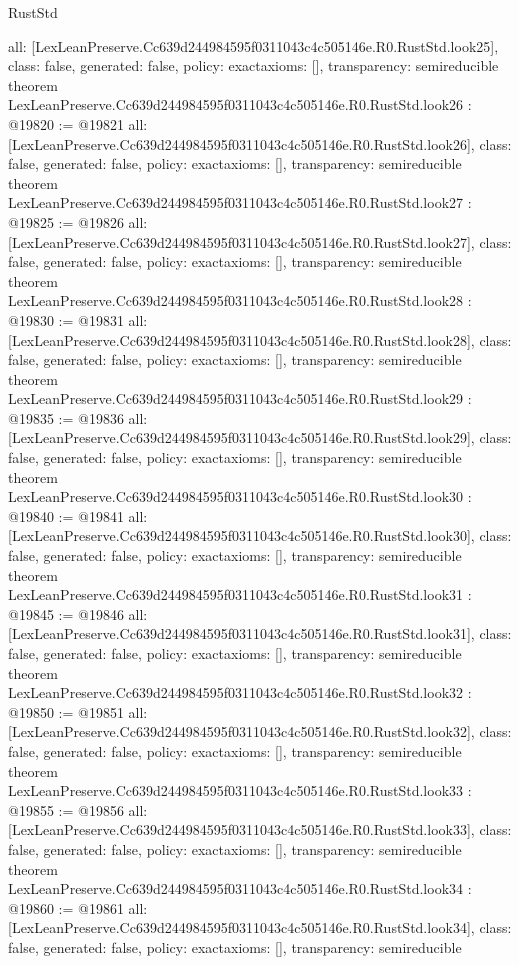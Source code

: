 \begin{lexlean}{RustStd}
\begin{coremodule}
{  all: [LexLeanPreserve.Cc639d244984595f0311043c4c505146e.R0.RustStd.look25],
  class: false,
  generated: false,
  policy: exact{axioms: []},
  transparency: semireducible
}
theorem LexLeanPreserve.Cc639d244984595f0311043c4c505146e.R0.RustStd.look26 : @19820 := @19821 {
  all: [LexLeanPreserve.Cc639d244984595f0311043c4c505146e.R0.RustStd.look26],
  class: false,
  generated: false,
  policy: exact{axioms: []},
  transparency: semireducible
}
theorem LexLeanPreserve.Cc639d244984595f0311043c4c505146e.R0.RustStd.look27 : @19825 := @19826 {
  all: [LexLeanPreserve.Cc639d244984595f0311043c4c505146e.R0.RustStd.look27],
  class: false,
  generated: false,
  policy: exact{axioms: []},
  transparency: semireducible
}
theorem LexLeanPreserve.Cc639d244984595f0311043c4c505146e.R0.RustStd.look28 : @19830 := @19831 {
  all: [LexLeanPreserve.Cc639d244984595f0311043c4c505146e.R0.RustStd.look28],
  class: false,
  generated: false,
  policy: exact{axioms: []},
  transparency: semireducible
}
theorem LexLeanPreserve.Cc639d244984595f0311043c4c505146e.R0.RustStd.look29 : @19835 := @19836 {
  all: [LexLeanPreserve.Cc639d244984595f0311043c4c505146e.R0.RustStd.look29],
  class: false,
  generated: false,
  policy: exact{axioms: []},
  transparency: semireducible
}
theorem LexLeanPreserve.Cc639d244984595f0311043c4c505146e.R0.RustStd.look30 : @19840 := @19841 {
  all: [LexLeanPreserve.Cc639d244984595f0311043c4c505146e.R0.RustStd.look30],
  class: false,
  generated: false,
  policy: exact{axioms: []},
  transparency: semireducible
}
theorem LexLeanPreserve.Cc639d244984595f0311043c4c505146e.R0.RustStd.look31 : @19845 := @19846 {
  all: [LexLeanPreserve.Cc639d244984595f0311043c4c505146e.R0.RustStd.look31],
  class: false,
  generated: false,
  policy: exact{axioms: []},
  transparency: semireducible
}
theorem LexLeanPreserve.Cc639d244984595f0311043c4c505146e.R0.RustStd.look32 : @19850 := @19851 {
  all: [LexLeanPreserve.Cc639d244984595f0311043c4c505146e.R0.RustStd.look32],
  class: false,
  generated: false,
  policy: exact{axioms: []},
  transparency: semireducible
}
theorem LexLeanPreserve.Cc639d244984595f0311043c4c505146e.R0.RustStd.look33 : @19855 := @19856 {
  all: [LexLeanPreserve.Cc639d244984595f0311043c4c505146e.R0.RustStd.look33],
  class: false,
  generated: false,
  policy: exact{axioms: []},
  transparency: semireducible
}
theorem LexLeanPreserve.Cc639d244984595f0311043c4c505146e.R0.RustStd.look34 : @19860 := @19861 {
  all: [LexLeanPreserve.Cc639d244984595f0311043c4c505146e.R0.RustStd.look34],
  class: false,
  generated: false,
  policy: exact{axioms: []},
  transparency: semireducible
}
\end{coremodule}
\end{lexlean}
